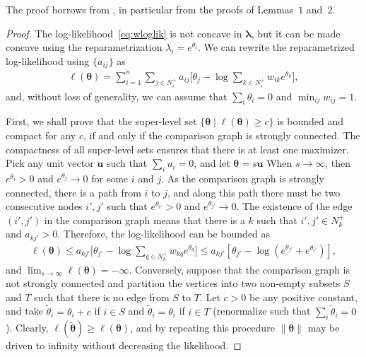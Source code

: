The proof borrows from \citet{hunter2004mm}, in particular from the proofs of Lemmas~$1$ and~$2$.

\begin{proof}
The log-likelihood~\eqref{eq:wloglik} is not concave in $\bm{\lambda}$, but it can be made concave using the reparametrization $\lambda_i = e^{\theta_i}$.
We can rewrite the reparametrized log-likelihood using $\{ a_{ij} \}$ as
\begin{align*}
    \ell(\bm{\theta})
        = \sum_{i = 1}^n \sum_{j \in N^+_i} a_{ij} \bigg[ \theta_j - \log \sum_{k \in N^+_i} w_{ik} e^{\theta_k} \bigg],
\end{align*}
and, without loss of generality, we can assume that $\sum_i \theta_i = 0$ and $\min_{ij} w_{ij} = 1$.

First, we shall prove that the super-level set $\{ \bm{\theta} \mid \ell(\bm{\theta}) \ge c \}$ is bounded and compact for any $c$, if and only if the comparison graph is strongly connected.
The compactness of all super-level sets ensures that there is at least one maximizer.
Pick any unit vector $\bm{u}$ such that $\sum_i u_i = 0$, and let $\bm{\theta} = s \bm{u}$
When $s \to \infty$, then $e^{\theta_i} > 0$ and $e^{\theta_j} \to 0 $ for some $i$ and $j$.
As the comparison graph is strongly connected, there is a path from $i$ to $j$, and along this path there must be two consecutive nodes $i', j'$ such that $e^{\theta_{i'}} > 0$ and $e^{\theta_{j'}} \to 0$.
The existence of the edge $(i',j')$ in the comparison graph means that there is a $k$ such that $i', j' \in N^+_k$ and $a_{kj'} > 0$.
Therefore, the log-likelihood can be bounded as
\begin{align*}
\ell(\bm{\theta})
    \le a_{kj'} \bigg[ \theta_{j'} - \log \sum_{q \in N^+_k} w_{kq} e^{\theta_q} \bigg]
    \le a_{kj'} \left[ \theta_{j'} - \log (e^{\theta_{j'}} + e^{\theta_{i'}}) \right],
\end{align*}
and $\lim_{s \to \infty} \ell(\bm{\theta}) = -\infty$.
Conversely, suppose that the comparison graph is not strongly connected and partition the vertices into two non-empty subsets $S$ and $T$ such that there is no edge from $S$ to $T$.
Let $c > 0$ be any positive constant, and take $\tilde{\theta}_i = \theta_i + c$ if $i \in S$ and $\tilde{\theta}_i = \theta_i$ if $i \in T$ (renormalize such that $\sum_i \tilde{\theta}_i = 0$).
Clearly, $\ell(\tilde{\bm{\theta}}) \ge \ell(\bm{\theta})$, and by repeating this procedure $\lVert \bm{\theta} \rVert$ may be driven to infinity without decreasing the likelihood.


\end{proof}
